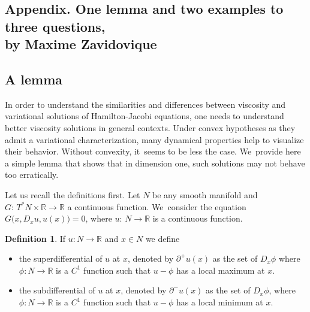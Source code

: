 \documentclass[10pt]{amsart}
\theoremstyle{definition}
\newtheorem{defn}[thm]{Definition}
\newcommand{\R}{\mathbb{R}}
\begin{document}
\begin{appendix}
\bgroup
\renewcommand{\thefootnote}{*}
\section*{Appendix. One lemma and two examples to three questions,\\
by Maxime Zavidovique\texorpdfstring{\protect\footnotemark}{fn}}
\label{appendix}
\egroup
\setcounter{footnote}{7}

\subsection{A lemma}
In order to understand the similarities and differences between viscosity and variational solutions of Hamilton-Jacobi equations, one needs to understand better viscosity solutions in general contexts. Under convex hypotheses as they admit a variational characterization, many dynamical properties help to visualize their behavior. Without convexity, it~seems to be less the case. We~provide here a simple lemma that shows that in dimension one, such solutions may not behave too erratically.

Let us recall the definitions first. Let $N$ be any smooth manifold and \hbox{$G{:}\, T^*N\!\!\times\! \R \!\to\! \R$} a continuous function. We~consider the equation $G\bigl(x, D_x u ,u(x)\bigr)\!=\!0 $, where $u{:}\, N \!\to\! \R$ is a continuous function.

\begin{defn}\rm
If $u : N\to \R$ and $x \in N$ we define
\begin{itemize}
\item the superdifferential of $u$ at $x$, denoted by $\partial^+u(x)$ as the set of $D_x\phi$ where $\phi : N\to \R$ is a $C^1$ function such that $u-\phi$ has a local maximum at $x$.
\item
the subdifferential of $u$ at $x$, denoted by $\partial^-u(x)$ as the set of $D_x\phi$, where \hbox{$\phi : N\to \R$} is a $C^1$ function such that $u-\phi$ has a local minimum at $x$.

\end{itemize}
\end{defn}


\end{appendix}
\end{document}
